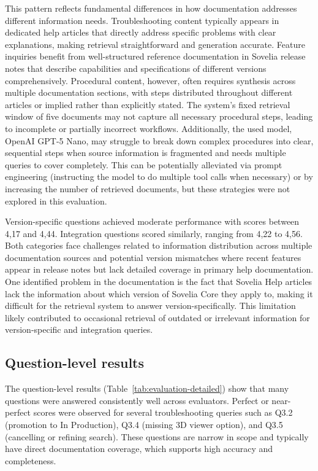 This pattern reflects fundamental differences in how documentation addresses different information needs. Troubleshooting content typically appears in dedicated help articles that directly address specific problems with clear explanations, making retrieval straightforward and generation accurate. Feature inquiries benefit from well-structured reference documentation in Sovelia release notes that describe capabilities and specifications of different versions comprehensively. Procedural content, however, often requires synthesis across multiple documentation sections, with steps distributed throughout different articles or implied rather than explicitly stated. The system's fixed retrieval window of five documents may not capture all necessary procedural steps, leading to incomplete or partially incorrect workflows. Additionally, the used model, OpenAI GPT-5 Nano, may struggle to break down complex procedures into clear, sequential steps when source information is fragmented and needs multiple queries to cover completely. This can be potentially alleviated via prompt engineering (instructing the model to do multiple tool calls when necessary) or by increasing the number of retrieved documents, but these strategies were not explored in this evaluation.

Version-specific questions achieved moderate performance with scores between 4,17 and 4,44. Integration questions scored similarly, ranging from 4,22 to 4,56. Both categories face challenges related to information distribution across multiple documentation sources and potential version mismatches where recent features appear in release notes but lack detailed coverage in primary help documentation. One identified problem in the documentation is the fact that Sovelia Help articles lack the information about which version of Sovelia Core they apply to, making it difficult for the retrieval system to answer version-specifically. This limitation likely contributed to occasional retrieval of outdated or irrelevant information for version-specific and integration queries.

\subsection{Question-level results}
\label{subsec:question-level-results}

The question-level results (Table~\ref{tab:evaluation-detailed}) show that many questions were answered consistently well across evaluators. Perfect or near-perfect scores were observed for several troubleshooting queries such as Q3.2 (promotion to In Production), Q3.4 (missing 3D viewer option), and Q3.5 (cancelling or refining search). These questions are narrow in scope and typically have direct documentation coverage, which supports high accuracy and completeness.

